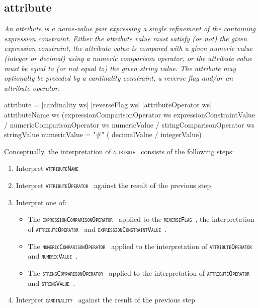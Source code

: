 \documentclass{article}
\def\spec#1{{\tt \small \textsc{{#1}} }}
\def\bnf#1{{\scriptsize {{#1}} }}
\def\desc#1{{\small \textsl{{#1}} }}
\begin{document}
\subsection{attribute}
\begin{framed}
\desc{An attribute is a name-value pair expressing a single refinement of the containing expression constraint. Either the attribute value must satisfy (or not) the given expression constraint, the attribute value is compared with a given numeric value (integer or decimal) using a numeric comparison operator, or the attribute value must be equal to (or not equal to) the given string value. The attribute may optionally be preceded by a cardinality constraint, a reverse flag and/or an attribute operator.}
\end{framed}

\begin{framed}
\noindent
\bnf{attribute = [cardinality ws] [reverseFlag ws] [attributeOperator ws] attributeName ws 		
			(expressionComparisonOperator ws expressionConstraintValue /
			 numericComparisonOperator ws numericValue / 		
			 stringComparisonOperator ws stringValue}
\bnf{numericValue =  "\#" ( decimalValue / integerValue)}
\end{framed}

Conceptually, the interpretation of \spec{attribute} consists of the following steps:
\begin{enumerate}[noitemsep]
\item Interpret \spec{attributeName}
\item Interpret \spec{attributeOperator} against the result of the previous step
\item Interpret one of:
\begin{itemize}[noitemsep]
\item The \spec{expressionComparisonOperator} applied to the \spec{reverseFlag}, the interpretation of \spec{attributeOperator} and  \spec{expressionConstraintValue}.
\item The \spec{numericComparisonOperator} applied to the interpretation of \spec{attributeOperator} and  \spec{numericValue}.
\item The \spec{stringComparisonOperator} applied to the interpretation of \spec{attributeOperator} and \spec{stringValue}.
\end{itemize} 
\item Interpret \spec{cardinality} against the result of the previous step
\end{enumerate}
\end{document}
